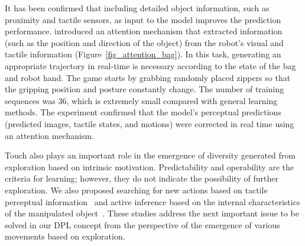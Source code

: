 It has been confirmed that including detailed object information, such as proximity and tactile sensors, as input to the model improves the prediction performance. \cite{Ichiwara2022contact} introduced an attention mechanism that extracted information (such as the position and direction of the object) from the robot's visual and tactile information (Figure~\ref{fig_attention_bag}). In this task, generating an appropriate trajectory in real-time is necessary according to the state of the bag and robot hand. The game starts by grabbing randomly placed zippers so that the gripping position and posture constantly change. The number of training sequences was 36, which is extremely small compared with general learning methods. The experiment confirmed that the model's perceptual predictions (predicted images, tactile states, and motions) were corrected in real time using an attention mechanism.


Touch also plays an important role in the emergence of diversity generated from exploration based on intrinsic motivation. Predictability and operability are the criteria for learning; however, they do not indicate the possibility of further exploration. We also proposed searching for new actions based on tactile perceptual information~\cite{Mori2020} and active inference based on the internal characteristics of the manipulated object~\cite{Saito2021,Saito2023a}. These studies address the next important issue to be solved in our DPL concept from the perspective of the emergence of various movements based on exploration.


